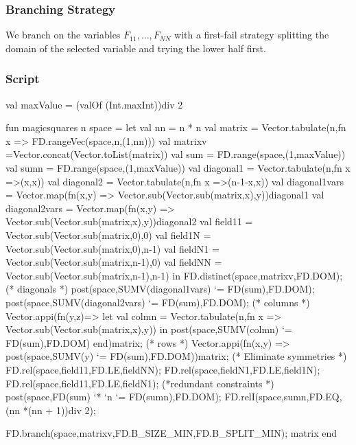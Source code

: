 \documentclass[a4paper,halfparskip]{scrartcl}
\begin{document}
\subsubsection{Branching Strategy}
We branch on the variables  $F_{11}, \ldots, F_{NN} $ with a first-fail 
strategy splitting the domain of the selected variable and trying 
the lower half first. 

\subsubsection{Script}
\begin{myverbatim}
val maxValue = (valOf (Int.maxInt))div 2

fun magicsquares n space =
    let
        val nn = n * n
        val matrix = Vector.tabulate(n,fn x => 
                              FD.rangeVec(space,n,(1,nn)))
        val matrixv =Vector.concat(Vector.toList(matrix))
        val sum = FD.range(space,(1,maxValue))
        val sumn = FD.range(space,(1,maxValue))
        val diagonal1 = Vector.tabulate(n,fn x =>(x,x))
        val diagonal2 = Vector.tabulate(n,fn x =>(n-1-x,x))
        val diagonal1vars = Vector.map(fn(x,y) => 
               Vector.sub(Vector.sub(matrix,x),y))diagonal1  
        val diagonal2vars = Vector.map(fn(x,y) => 
               Vector.sub(Vector.sub(matrix,x),y))diagonal2
        val field11 = Vector.sub(Vector.sub(matrix,0),0) 
        val field1N = Vector.sub(Vector.sub(matrix,0),n-1)
        val fieldN1 = Vector.sub(Vector.sub(matrix,n-1),0)
        val fieldNN = Vector.sub(Vector.sub(matrix,n-1),n-1)                 
    in
        FD.distinct(space,matrixv,FD.DOM);
        (* diagonals *)
        post(space,SUMV(diagonal1vars) `= FD(sum),FD.DOM);
        post(space,SUMV(diagonal2vars) `= FD(sum),FD.DOM);
        (* columns *)
        Vector.appi(fn(y,z)=>
         let 
            val colmn = Vector.tabulate(n,fn x =>
                         Vector.sub(Vector.sub(matrix,x),y)) 
         in
            post(space,SUMV(colmn) `= FD(sum),FD.DOM)
         end)matrix;
        (* rows *)
        Vector.appi(fn(x,y) =>
                     post(space,SUMV(y) `= FD(sum),FD.DOM))matrix;
        (* Eliminate symmetries *)
        FD.rel(space,field11,FD.LE,fieldNN);
        FD.rel(space,fieldN1,FD.LE,field1N);
        FD.rel(space,field11,FD.LE,fieldN1);
        (*redundant constraints *)
        post(space,FD(sum) `* `n `= FD(sumn),FD.DOM);
        FD.relI(space,sumn,FD.EQ,(nn *(nn + 1))div 2);
        
        FD.branch(space,matrixv,FD.B_SIZE_MIN,FD.B_SPLIT_MIN);
        {matrix}  
    end
\end{myverbatim}
\end{document}
